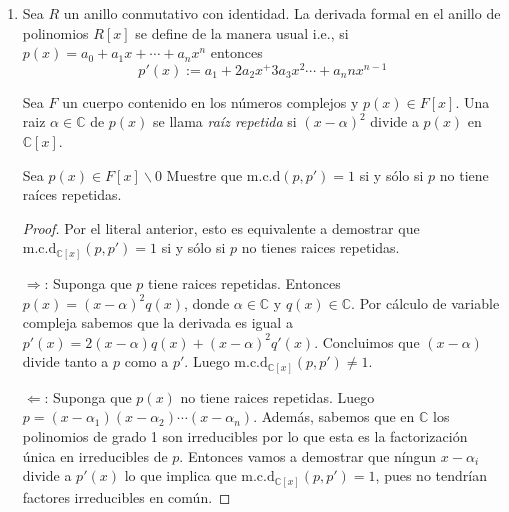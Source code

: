 \documentclass[letter,twoside,12pt]{article}
\begin{document}
\begin{enumerate}
\begin{enumerate}
\begin{proof}
Observación: Tanto en $ F[x] $ como en $ K[x] $ las unidades son los polinomios de grado 0, es decir las constantes. Esto es una consecuencia de la norma euclidea asociada a estos anillos.

$ \Leftarrow $: Si suponemos por contradicción que $ m= \text{m.c.d}_{F [x]}(p, q) \not = 1$ entonces $m$ es un polinomio de grado mayor a 0 que divide tanto a $p$ como a $q$. Entonces extendiendo a $ K[x] $, $ m $ sigue dividiendo tanto a $ p $ como a $ q $ y por lo tanto debe dividir a $ \text{m.c.d}_{K [x]}(p, q) $, que por lo tanto no puede ser igual a 1 porque $ m $ no es una unidad en $ K[x] $. 
\end{proof}
\item Sea $ R $ un anillo conmutativo con identidad. La derivada formal en el anillo de polinomios $ R[x] $ se
define de la manera usual i.e., si $ p(x) = a_0 + a_1x + \cdots + a_nx ^ n $ entonces
\begin{equation}
 p'(x) := a_1 + 2a_2x^+3a_3x^2 \cdots + a_nnx ^ {n-1} \nonumber
\end{equation}

Sea $ F $ un cuerpo contenido en los números complejos y $ p(x) \in F[x] $. Una raiz $ \alpha \in \mathbb{C} $ de $ p(x) $ se llama
\textit{raíz repetida} si $ (x - \alpha)^2 $  divide a $ p(x) $ en $ \mathbb{C}[x] $.

Sea $ p(x) \in F[x]\backslash{0} $ Muestre que m.c.d$ (p, p'
) = 1 $ si y sólo si $ p $ no tiene raíces repetidas.
\begin{proof}
Por el literal anterior, esto es equivalente a demostrar  que $ \text{m.c.d}_{\mathbb{C}[x]}(p, p') = 1 $ si y sólo si $ p $ no tienes raices repetidas.

$ \Rightarrow $: Suponga que $ p $ tiene raices repetidas. Entonces $ p(x) = (x-\alpha)^2q(x)$, donde $ \alpha \in \mathbb{C} $ y $ q(x) \in \mathbb{C} $. Por cálculo de variable compleja sabemos que la derivada es igual a $ p'(x) = 2(x-\alpha)q(x)+(x-\alpha)^2q'(x)$. Concluimos que $ (x-\alpha) $ divide tanto a $ p $ como a $ p' $. Luego $ \text{m.c.d}_{\mathbb{C}[x]}(p, p') \not = 1 $.

$ \Leftarrow $: Suponga que $ p(x) $ no tiene raices repetidas. Luego $ p = (x-\alpha_1)(x-\alpha_2)\cdots (x-\alpha_n) $. Además, sabemos que en $ \mathbb{C} $ los polinomios de grado 1 son irreducibles por lo que esta es la factorización única en irreducibles de $ p $. Entonces vamos a demostrar que níngun $ x- \alpha_i $ divide a $ p'(x) $ lo que implica que $ \text{m.c.d}_{\mathbb{C}[x]}(p, p') = 1 $, pues no tendrían factores irreducibles en común.


\end{proof}
\end{enumerate}
\end{enumerate}
\end{document}
